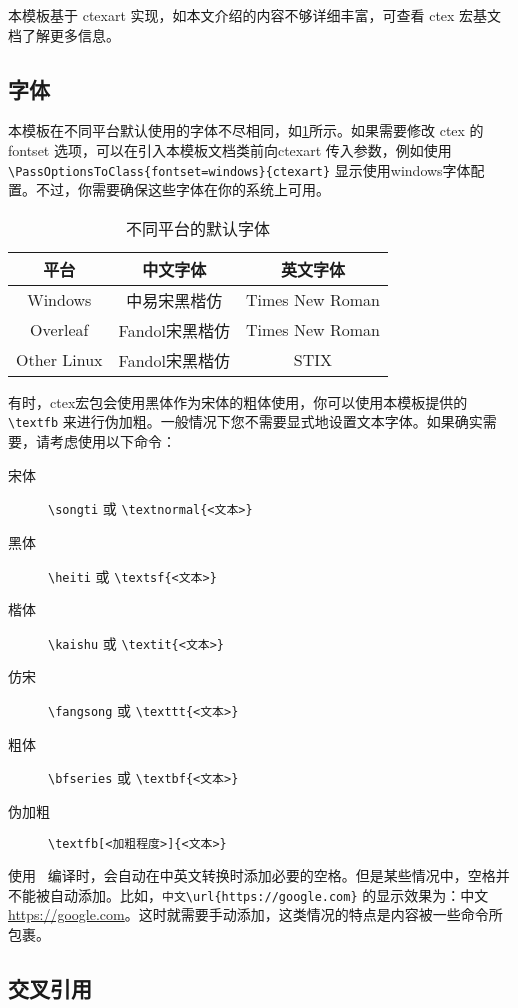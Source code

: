 \documentclass{nkuthesis}
\begin{document}
本模板基于 ctexart 实现，如本文介绍的内容不够详细丰富，可查看 ctex 宏基文档了解更多信息。

\subsection{字体}

本模板在不同平台默认使用的字体不尽相同，如\ref{tab:ctex-fontset}所示。如果需要修改 ctex 的 fontset 选项，可以在引入本模板文档类前向ctexart 传入参数，例如使用 \verb| \PassOptionsToClass{fontset=windows}{ctexart}| 显示使用windows字体配置。不过，你需要确保这些字体在你的系统上可用。

\begin{table}
  \centering
  \caption{不同平台的默认字体}
  \begin{tabular}{ccc}
  \toprule
  平台 & 中文字体 & 英文字体 \\
  \midrule
  Windows & 中易宋黑楷仿 & Times New Roman \\
  Overleaf & Fandol宋黑楷仿 & Times New Roman\\
  Other Linux & Fandol宋黑楷仿 & STIX \\
  \bottomrule
  \end{tabular}
  \label{tab:ctex-fontset}
\end{table}

有时，ctex宏包会使用黑体作为宋体的粗体使用，你可以使用本模板提供的\verb|\textfb| 来进行伪加粗。一般情况下您不需要显式地设置文本字体。如果确实需要，请考虑使用以下命令：

\begin{description}
\item[宋体] \verb|\songti| 或 \verb|\textnormal{<文本>}|
\item[黑体] \verb|\heiti| 或 \verb|\textsf{<文本>}|
\item[楷体] \verb|\kaishu|  或 \verb|\textit{<文本>}|
\item[仿宋] \verb|\fangsong| 或 \verb|\texttt{<文本>}|
\item[粗体] \verb|\bfseries| 或 \verb|\textbf{<文本>}|
\item[伪加粗] \verb|\textfb[<加粗程度>]{<文本>}|
\end{description}

使用 \ 编译时，会自动在中英文转换时添加必要的空格。但是某些情况中，空格并不能被自动添加。比如，\verb|中文\url{https://google.com}| 的显示效果为：中文\url{https://google.com}。这时就需要手动添加，这类情况的特点是内容被一些命令所包裹。

\subsection{交叉引用} \label{sec:ex:A}
\end{document}
